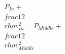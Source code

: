 \documentclass[preview]{standalone}
\begin{document}
\begin{align*}
P_{In} + \\frac{1}{2} \\rho v_{In}^2 = P_{Middle} + \\frac{1}{2} \\rho v_{Middle}^2
\end{align*}
\end{document}
